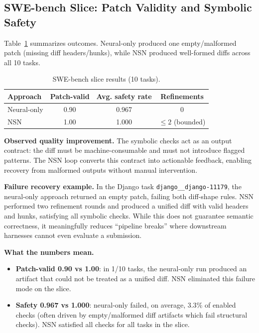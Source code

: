 \documentclass[conference]{IEEEtran}
\begin{document}
\subsection{SWE-bench Slice: Patch Validity and Symbolic Safety}
Table~\ref{tab:swebench} summarizes outcomes. Neural-only produced one empty/malformed patch (missing diff headers/hunks), while NSN produced well-formed diffs across all 10 tasks.

\begin{table}[t]
\centering
\caption{SWE-bench slice results (10 tasks).}
\label{tab:swebench}
\begin{tabular}{lccc}
\toprule
\textbf{Approach} & \textbf{Patch-valid} & \textbf{Avg. safety rate} & \textbf{Refinements} \\
\midrule
Neural-only & 0.90 & 0.967 & 0 \\
NSN & 1.00 & 1.000 & $\leq 2$ (bounded) \\
\bottomrule
\end{tabular}
\end{table}

\textbf{Observed quality improvement.} The symbolic checks act as an output contract: the diff must be machine-consumable and must not introduce flagged patterns. The NSN loop converts this contract into actionable feedback, enabling recovery from malformed outputs without manual intervention.

\textbf{Failure recovery example.} In the Django task \texttt{django\_\_django-11179}, the neural-only approach returned an empty patch, failing both diff-shape rules. NSN performed two refinement rounds and produced a unified diff with valid headers and hunks, satisfying all symbolic checks. While this does not guarantee semantic correctness, it meaningfully reduces ``pipeline breaks'' where downstream harnesses cannot even evaluate a submission.

\textbf{What the numbers mean.}
\begin{itemize}
  \item \textbf{Patch-valid 0.90 vs 1.00}: in 1/10 tasks, the neural-only run produced an artifact that could not be treated as a unified diff. NSN eliminated this failure mode on the slice.
  \item \textbf{Safety 0.967 vs 1.000}: neural-only failed, on average, \(3.3\%\) of enabled checks (often driven by empty/malformed diff artifacts which fail structural checks). NSN satisfied all checks for all tasks in the slice.
\end{itemize}
\end{document}
